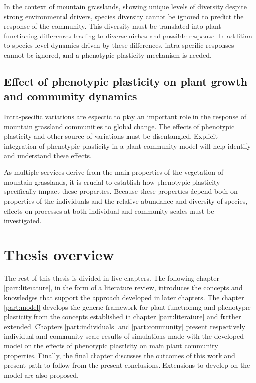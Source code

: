 In the context of mountain grasslands, showing unique levels of diversity despite strong environmental drivers, species diversity cannot be ignored to predict the response of the community. This diversity must be translated into plant functioning differences leading to diverse niches and possible response. In addition to species level dynamics driven by these differences, intra-specific responses cannot be ignored, and a phenotypic plasticity mechanism is needed.




\subsection{Effect of phenotypic plasticity on plant growth and community dynamics}

Intra-psecific variations are espectic to play an important role in the response of mountain grassland communities to global change. The effects of phenotypic plasticity and other source of variations must be disentangled. Explicit integration of phenotypic plasticity in a plant community model will help identify and understand these effects.

As multiple services derive from the main properties of the vegetation of mountain grasslands, it is crucial to establish how phenotypic plasticity specifically impact these properties. Because these properties depend both on properties of the individuals and the relative abundance and diversity of species, effects on processes at both individual and community scales must be investigated.


\section{Thesis overview}

The rest of this thesis is divided in five chapters. The following chapter \ref{part:literature}, in the form of a literature review, introduces the concepts and knowledges that support the approach developed in later chapters. The chapter \ref{part:model} develops the generic framework for plant functioning and phenotypic plasticity from the concepts established in chapter \ref{part:literature} and further extended. Chapters \ref{part:individuals} and \ref{part:community} present respectively individual and community scale results of simulations made with the developed model \model on the effects of phenotypic plasticity on main plant community properties. Finally, the final chapter discusses the outcomes of this work and present path to follow from the present conclusions. Extensions to develop on the model are also proposed.
